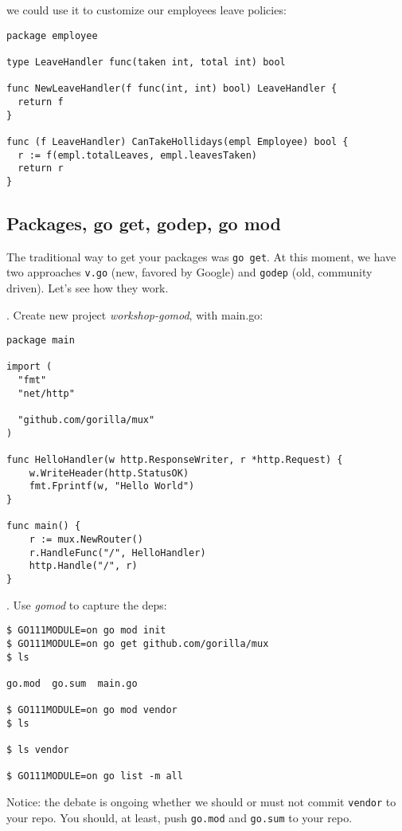 \documentclass[11pt, letterpaper]{article}
\begin{document}
we could use it to customize our employees leave policies:

\begin{verbatim}
package employee

type LeaveHandler func(taken int, total int) bool

func NewLeaveHandler(f func(int, int) bool) LeaveHandler {
  return f
}

func (f LeaveHandler) CanTakeHollidays(empl Employee) bool {
  r := f(empl.totalLeaves, empl.leavesTaken)
  return r
}
\end{verbatim}

\subsection{Packages, go get, godep, go mod}

The traditional way to get your packages was \verb|go get|. At this moment, we have two approaches \verb|v.go| (new, favored by Google) and \verb|godep| (old, community driven). Let's see how they work.

. Create new project \emph{workshop-gomod}, with main.go:

\begin{verbatim}
package main

import (
  "fmt"
  "net/http"

  "github.com/gorilla/mux"
)

func HelloHandler(w http.ResponseWriter, r *http.Request) {
    w.WriteHeader(http.StatusOK)
    fmt.Fprintf(w, "Hello World")
}

func main() {
    r := mux.NewRouter()
    r.HandleFunc("/", HelloHandler)
    http.Handle("/", r)
}
\end{verbatim}


. Use \emph{gomod} to capture the deps:

\begin{verbatim}
$ GO111MODULE=on go mod init
$ GO111MODULE=on go get github.com/gorilla/mux
$ ls

go.mod  go.sum  main.go

$ GO111MODULE=on go mod vendor
$ ls

$ ls vendor

$ GO111MODULE=on go list -m all
\end{verbatim}

Notice: the debate is ongoing whether we should or must not commit \verb|vendor| to your repo. You should, at least, push \verb|go.mod| and \verb|go.sum| to your repo.
\end{document}
